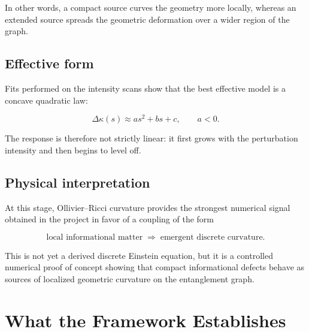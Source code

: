 \documentclass[11pt]{article}
\begin{document}
In other words, a compact source curves the geometry more locally, whereas an extended source spreads the geometric deformation over a wider region of the graph.

\subsection{Effective form}

Fits performed on the intensity scans show that the best effective model is a concave quadratic law:

\[
\Delta \kappa(s)\approx as^2+bs+c,
\qquad a<0.
\]

The response is therefore not strictly linear: it first grows with the perturbation intensity and then begins to level off.

\subsection{Physical interpretation}

At this stage, Ollivier--Ricci curvature provides the strongest numerical signal obtained in the project in favor of a coupling of the form

\[
\text{local informational matter}
\;\Longrightarrow\;
\text{emergent discrete curvature}.
\]

This is not yet a derived discrete Einstein equation, but it is a controlled numerical proof of concept showing that compact informational defects behave as sources of localized geometric curvature on the entanglement graph.


\section{What the Framework Establishes}
\end{document}
